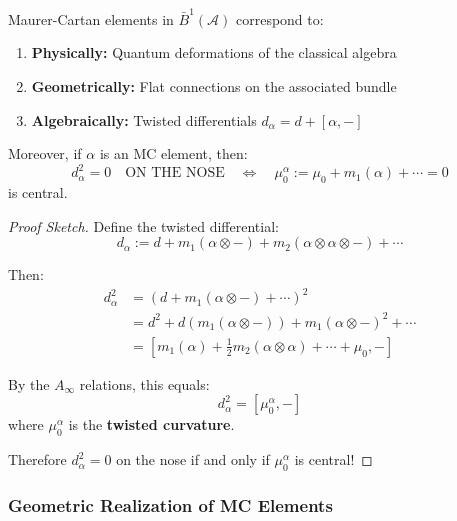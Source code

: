 \begin{theorem}\label{thm:mc-deformations}
Maurer-Cartan elements in $\bar{B}^1(\mathcal{A})$ correspond to:
\begin{enumerate}
\item \textbf{Physically:} Quantum deformations of the classical algebra
\item \textbf{Geometrically:} Flat connections on the associated bundle
\item \textbf{Algebraically:} Twisted differentials $d_\alpha = d + [\alpha, -]$
\end{enumerate}

Moreover, if $\alpha$ is an MC element, then:
\begin{equation}
d_\alpha^2 = 0 \quad \text{ON THE NOSE} \quad \Longleftrightarrow \quad \mu_0^\alpha := \mu_0 
+ m_1(\alpha) + \cdots = 0
\end{equation}
is central.
\end{theorem}

\begin{proof}[Proof Sketch]
Define the twisted differential:
$$d_\alpha := d + m_1(\alpha \otimes -) + m_2(\alpha \otimes \alpha \otimes -) + \cdots$$

Then:
\begin{align}
d_\alpha^2 &= (d + m_1(\alpha \otimes -) + \cdots)^2 \\
&= d^2 + d(m_1(\alpha \otimes -)) + m_1(\alpha \otimes -)^2 + \cdots \\
&= [m_1(\alpha) + \frac{1}{2}m_2(\alpha \otimes \alpha) + \cdots + \mu_0, -]
\end{align}

By the $A_\infty$ relations, this equals:
$$d_\alpha^2 = [\mu_0^\alpha, -]$$
where $\mu_0^\alpha$ is the \textbf{twisted curvature}.

Therefore $d_\alpha^2 = 0$ on the nose if and only if $\mu_0^\alpha$ is central!
\end{proof}

\subsubsection{Geometric Realization of MC Elements}

